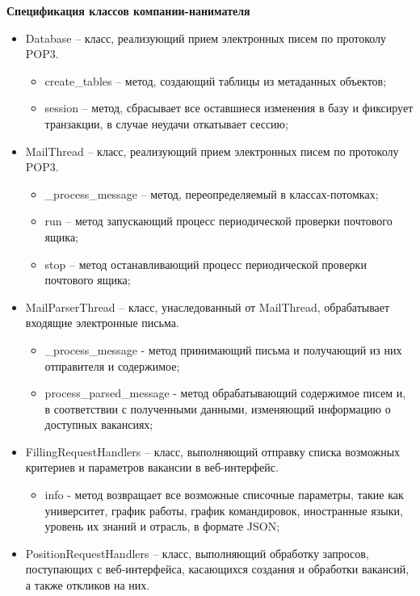 \textbf{Спецификация классов компании-нанимателя}
\begin{itemize}
\item Database – класс, реализующий прием электронных писем по протоколу POP3.
	\begin{itemize}
	\item create_tables – метод, создающий таблицы из метаданных объектов;
	\item session – метод, сбрасывает все оставшиеся изменения в базу и фиксирует транзакции, в случае неудачи откатывает сессию;
	\end{itemize}	
\item MailThread – класс, реализующий прием электронных писем по протоколу POP3.
	\begin{itemize}
	\item _process_message – метод, переопределяемый в классах-потомках;                                                                   
	\item run – метод запускающий процесс периодической проверки почтового ящика;
	\item stop – метод останавливающий процесс периодической проверки почтового ящика;
	\end{itemize}
\item MailParserThread – класс, унаследованный от MailThread, обрабатывает входящие электронные письма.
	\begin{itemize}
	\item _process_message - метод принимающий письма и получающий из них отправителя и содержимое;     
	\item \underline{ }\underline{ }process_parsed_message - метод обрабатывающий содержимое писем и, в соответствии с полученными данными, изменяющий информацию о доступных вакансиях;
	\end{itemize}
\item FillingRequestHandlers –  класс, выполняющий отправку списка возможных критериев и параметров вакансии в веб-интерфейс.
	\begin{itemize}
	\item info - метод возвращает все возможные списочные параметры, такие как университет, график работы, график командировок, иностранные языки, уровень их знаний и отрасль, в формате JSON;
	\end{itemize}
\item PositionRequestHandlers – класс, выполняющий обработку запросов, поступающих с веб-интерфейса, касающихся создания и обработки вакансий, а также откликов на них.

\end{itemize}
